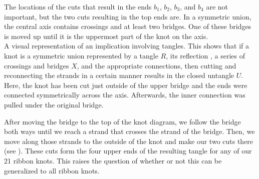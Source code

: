 \begin{paper}
The locations of the cuts that result in the ends $b_1$, $b_2$, $b_3$, and
$b_4$ are not important, but the two cuts resulting in the top ends are.
In a symmetric union, the central axis contains crossings and at least two
bridges.
One of these bridges is moved up until it is the uppermost part of the knot on
the axis.\newsavebox{\knotR}\\

{A visual representation of an implication involving tangles.
This shows that if a knot is a symmetric union represented by a tangle $R$, its
reflection \usebox{\knotR}, a series of crossings and bridges $X$, and the
appropriate connections, then cutting and reconnecting the strands in a certain
manner results in the closed untangle $U$.
Here, the knot has been cut just outside of the upper bridge and the ends were
connected symmetrically across the axis.
Afterwards, the inner connection was pulled under the original bridge.}

After moving the bridge to the top of the knot diagram, we follow the bridge
both ways until we reach a strand that crosses the strand of the bridge.
Then, we move along those strands to the outside of the knot and make our two
cuts there (see \figQuestion).
These cuts form the four upper ends of the resulting tangle for any of our 21
ribbon knots.
This raises the question of whether or not this can be generalized to all ribbon
knots.


\end{paper}
